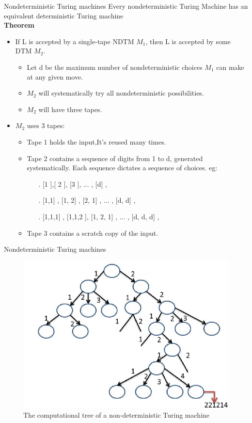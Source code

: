 \documentclass{beamer}
\begin{document}
\begin{frame}{Nondeterministic Turing machines}
Every nondeterministic Turing Machine has an equivalent deterministic Turing machine\\
	\textbf{Theorem}
	\begin{itemize}
		\item If L is accepted by a single-tape NDTM $M_1$, then L is accepted by some DTM $M_2$.
	\begin{itemize}
	\item Let d be the maximum number of nondeterministic 
		choices $M_1$ can make at any given move.
			\item 	 $M_2$ will systematically try all nondeterministic 
		possibilities.
			\item 	 $M_2$ will have three tapes.
	\end{itemize}
\item $M_2$ uses 3 tapes:
\begin{itemize}
	\item Tape 1 holds the input,It’s reused many
	times.
	\item Tape 2 contains a sequence of digits from 1 to d, 
	generated systematically. Each sequence dictates a 
	sequence of choices. eg: 
	 \begin{itemize}
	 	\item[.]  [1 ],[ 2 ], [3 ], ... , [d] ,
	 	\item[.]  [1,1] , [1, 2] , [2, 1] , ... , [d, d] ,
	 	\item[.]  [1,1,1] , [1,1,2 ], [1, 2, 1] , ... , [d, d, d] ,
	 \end{itemize}
 \item Tape 3 contains a scratch copy of the input.
\end{itemize}
	\end{itemize}
\end{frame}
\begin{frame}{Nondeterministic Turing machines}
	\begin{figure}
		\includegraphics[scale=.5]{img5/m20}
		\caption{The computational tree of a non-deterministic Turing machine}
	\end{figure}
\end{frame}
\end{document}
